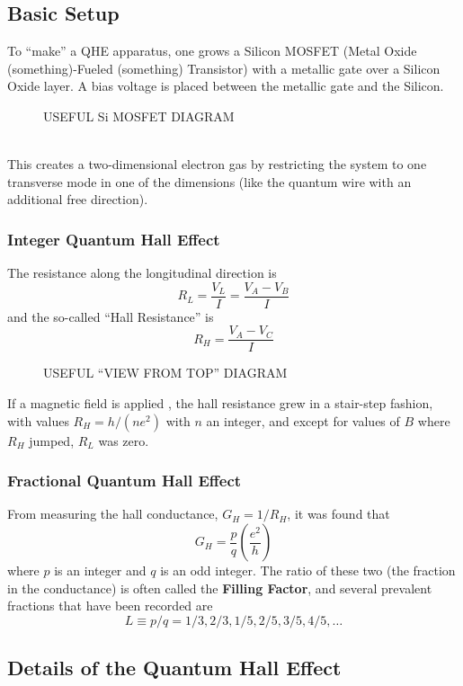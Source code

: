 \documentclass{article}
\begin{document}
	\subsection{Basic Setup}
	To ``make'' a QHE apparatus, one grows a Silicon MOSFET (Metal Oxide (something)-Fueled (something) Transistor) with a metallic gate over a Silicon Oxide layer. A bias voltage is placed between the metallic gate and the Silicon.\\
	\begin{figure}[h]
		\caption{USEFUL Si MOSFET DIAGRAM}
	\end{figure}	\\
	\noindent This creates a two-dimensional electron gas by restricting the system to one transverse mode in one of the dimensions (like the quantum wire with an additional free direction). \\
	
	\subsubsection{Integer Quantum Hall Effect} The resistance along the longitudinal direction is
	$$R_{L}=\frac{V_L}{I}=\frac{V_A-V_B}{I}$$
	and the so-called ``Hall Resistance'' is
	$$R_H=\frac{V_A-V_C}{I}$$
	\begin{figure}[h]
		\caption{USEFUL ``VIEW FROM TOP'' DIAGRAM}
	\end{figure}
If a magnetic field is applied , the hall resistance grew in a stair-step fashion, with values $R_H=h/(ne^2)$ with $n$ an integer, and except for values of $B$ where $R_H$ jumped, $R_L$ was zero.

	\subsubsection{Fractional Quantum Hall Effect}
	From measuring the hall conductance, $G_H=1/R_H$, it was found that
	$$G_H=\frac{p}{q}\left(\frac{e^2}{h}\right)$$
	where $p$ is an integer and $q$ is an odd integer. The ratio of these two (the fraction in the conductance) is often called the \textbf{Filling Factor}, and several prevalent fractions that have been recorded are
	$$L\equiv p/q=1/3, 2/3,1/5,2/5,3/5,4/5,\ldots$$

	\subsection{Details of the Quantum Hall Effect}
\end{document}
